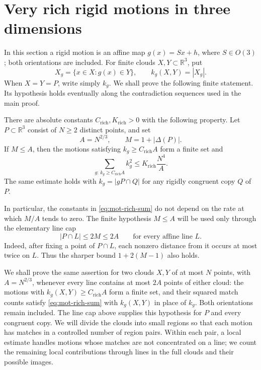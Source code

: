 \section{Very rich rigid motions in three dimensions}
\label{sec:mot-section}

In this section a rigid motion is an affine map $g(x)=Sx+h$, where $S\in O(3)$; both orientations are included. For finite clouds $X,Y\subset\mathbb{R}^3$, put
\[
 X_g=\{x\in X:g(x)\in Y\},
 \qquad k_g(X,Y)=|X_g|.
\]
When $X=Y=P$, write simply $k_g$. We shall prove the following finite statement.  Its hypothesis holds eventually along the contradiction sequences used in the main proof.

\begin{theorem}
\label{thm:mot-rich}
There are absolute constants $C_{\mathrm{rich}},K_{\mathrm{rich}}>0$ with the following property.  Let $P\subset\mathbb{R}^3$ consist of $N\ge2$ distinct points, and set
\[
 A=N^{2/3},\qquad M=1+|\Delta(P)|.
\]
If $M\le A$, then the motions satisfying $k_g\ge C_{\mathrm{rich}}A$ form a finite set and
\begin{equation}
\label{eq:mot-rich-sum}
 \sum_{g:\,k_g\ge C_{\mathrm{rich}}A} k_g^2
 \le K_{\mathrm{rich}}\frac{N^4}{A}.
\end{equation}
The same estimate holds with $k_g=|gP\cap Q|$ for any rigidly congruent copy $Q$ of $P$.
\end{theorem}

In particular, the constants in \eqref{eq:mot-rich-sum} do not depend on the rate at which $M/A$ tends to zero.  The finite hypothesis $M\le A$ will be used only through the elementary line cap
\begin{equation}
\label{eq:mot-physical-line-cap}
 |P\cap L|\le 2M\le2A
 \qquad\text{for every affine line }L.
\end{equation}
Indeed, after fixing a point of $P\cap L$, each nonzero distance from it occurs at most twice on $L$.  Thus the sharper bound $1+2(M-1)$ also holds.

We shall prove the same assertion for two clouds $X,Y$ of at most $N$ points, with $A=N^{2/3}$, whenever every line contains at most $2A$ points of either cloud: the motions with $k_g(X,Y)\ge C_{\mathrm{rich}}A$ form a finite set, and their squared match counts satisfy \eqref{eq:mot-rich-sum} with $k_g(X,Y)$ in place of $k_g$.  Both orientations remain included.  The line cap above supplies this hypothesis for $P$ and every congruent copy.  We will divide the clouds into small regions so that each motion has matches in a controlled number of region pairs.  Within each pair, a local estimate handles motions whose matches are not concentrated on a line; we count the remaining local contributions through lines in the full clouds and their possible images.

